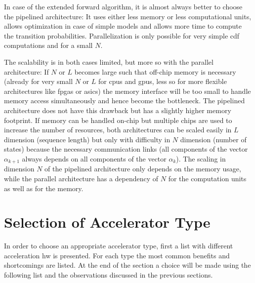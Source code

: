 \documentclass[mscthesis]{usiinfthesis}
\begin{document}
In case of the extended forward algorithm, it is almost always better to choose
the pipelined architecture: It uses either less memory or less computational
units, allows optimization in case of simple models and allows more time to
compute the transition probabilities. Parallelization is only possible for very
simple \gls{cdf} computations and for a small $N$.

The scalability is in both cases limited, but more so with the parallel
architecture: If $N$ or $L$ becomes large such that off-chip memory is
necessary (already for very small $N$ or $L$ for \glspl{cpu} and \glspl{gpu},
less so for more flexible architectures like \glspl{fpga} or \glspl{asic}) the
memory interface will be too small to handle memory access simultaneously and
hence become the bottleneck. The pipelined architecture does not have this
drawback but has a slightly higher memory footprint. If memory can be handled
on-chip but multiple chips are used to increase the number of resources, both
architectures can be scaled easily in $L$ dimension (sequence length) but only
with difficulty in $N$ dimension (number of states) because the necessary
communication links (all components of the vector $\alpha_{k+1}$ always depends
on all components of the vector $\alpha_k$). The scaling in dimension $N$ of
the pipelined architecture only depends on the memory usage, while the parallel
architecture has a dependency of $N$ for the computation units as well as for
the memory.

\section{Selection of Accelerator Type}
\label{ch:analysis_choice}

In order to choose an appropriate accelerator type, first a list with different
acceleration \gls{hw} is presented. For each type the most common benefits and
shortcomings are listed. At the end of the section a choice will be made using
the following list and the observations discussed in the previous sections.
\end{document}
